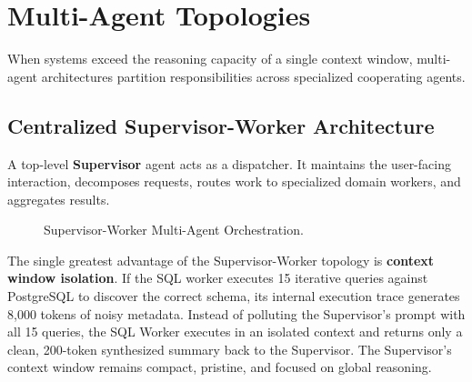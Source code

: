 \section{Multi-Agent Topologies}

When systems exceed the reasoning capacity of a single context window, multi-agent architectures partition responsibilities across specialized cooperating agents.

\subsection{Centralized Supervisor-Worker Architecture}
A top-level \textbf{Supervisor} agent acts as a dispatcher. It maintains the user-facing interaction, decomposes requests, routes work to specialized domain workers, and aggregates results.

\begin{figure}[htbp]
\centering
{}
\caption{Supervisor-Worker Multi-Agent Orchestration.}
\label{fig:supervisor_worker}
\end{figure}

\begin{underthehoodbox}
The single greatest advantage of the Supervisor-Worker topology is \textbf{context window isolation}. 
If the SQL worker executes 15 iterative queries against PostgreSQL to discover the correct schema, its internal execution trace generates 8,000 tokens of noisy metadata.
Instead of polluting the Supervisor's prompt with all 15 queries, the SQL Worker executes in an isolated context and returns only a clean, 200-token synthesized summary back to the Supervisor. The Supervisor's context window remains compact, pristine, and focused on global reasoning.
\end{underthehoodbox}

